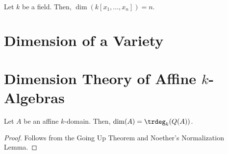 \begin{corollary}
    Let $k$ be a field. Then, $\dim(k[x_1,\dots,x_n]) = n$.
\end{corollary}

\section{Dimension of a Variety}

\section{Dimension Theory of Affine \texorpdfstring{$k$}{k}-Algebras}

\begin{theorem}
    Let $A$ be an affine $k$-domain. Then, $\dim(A) = \trdeg_k(Q(A))$.
\end{theorem}
\begin{proof}
    Follows from the Going Up Theorem and Noether's Normalization Lemma.
\end{proof}

